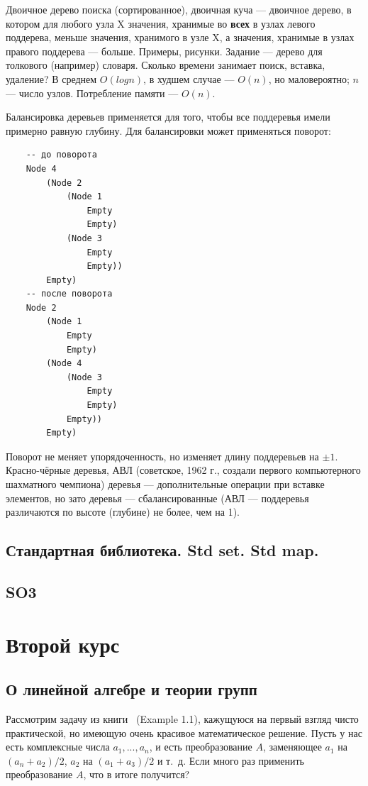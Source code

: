 \documentclass{book}
\begin{document}
Двоичное дерево поиска (сортированное), двоичная куча --- двоичное дерево, в котором для любого
узла X значения, хранимые во {\bf всех} в узлах левого поддерева, меньше значения, хранимого в узле
X, а значения, хранимые в узлах правого поддерева --- больше. Примеры, рисунки. Задание --- дерево
для толкового (например) словаря. Сколько времени занимает поиск, вставка, удаление? В среднем
$O(log n)$, в худшем случае --- $O(n)$, но маловероятно; $n$ --- число узлов. Потребление памяти
--- $O(n)$.

Балансировка деревьев применяется для того, чтобы все поддеревья имели примерно равную глубину. Для
балансировки может применяться поворот:
\begin{verbatim}
    -- до поворота
    Node 4
        (Node 2
            (Node 1
                Empty
                Empty)
            (Node 3
                Empty
                Empty))
        Empty)
    -- после поворота
    Node 2
        (Node 1
            Empty
            Empty)
        (Node 4
            (Node 3
                Empty
                Empty)
            Empty))
        Empty)
\end{verbatim}
Поворот не меняет упорядоченность, но изменяет длину поддеревьев на $\pm 1$. Красно-чёрные деревья,
АВЛ (советское, 1962 г., создали первого компьютерного шахматного чемпиона) деревья ---
дополнительные операции при вставке элементов, но зато деревья --- сбалансированные (АВЛ ---
поддеревья различаются по высоте (глубине) не более, чем на 1).


\subsection{Стандартная библиотека. Std set. Std map.}

\subsection{SO3}

\section{Второй курс}

\subsection{О линейной алгебре и теории групп}

Рассмотрим задачу из книги~\cite{Kirillov08} (Example 1.1), кажущуюся на первый взгляд чисто
практической, но имеющую очень красивое математическое решение. Пусть у нас есть комплексные числа $a_1, ...,
a_n$, и есть преобразование $A$, заменяющее $a_1$ на $(a_n + a_2) / 2$, $a_2$ на $(a_1 + a_3) /
2$ и т.~д. Если много раз применить преобразование $A$, что в итоге получится?
\end{document}

